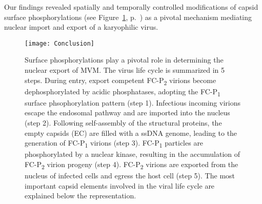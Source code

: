 \par
\medskip
Our findings revealed spatially and temporally controlled modifications of capsid surface phosphorylations (see Figure~\ref{Scheme}, p.~\pageref{Scheme}) as a pivotal mechanism mediating nuclear import and export of a karyophilic virus. 







\begin{figure}[H]
\centering
  \texttt{[image: Conclusion]}
  \caption[The pivotal role of capsid surface phosphorylations in the nuclear export of MVM.]
   {Surface phosphorylations play a pivotal role in determining the nuclear export of MVM. The virus life cycle is summarized in 5 steps. During entry, export competent FC-P\textsubscript{2} virions become dephosphorylated by acidic phosphatases, adopting the FC-P\textsubscript{1} surface phsophorylation pattern (step 1). Infectious incoming virions escape the endosomal pathway and are imported into the nucleus (step 2). Following self-assembly of the structural proteins, the empty capsids (EC) are filled with a ssDNA genome, leading to the generation of FC-P\textsubscript{1} virions (step 3). FC-P\textsubscript{1} particles are phosphorylated by a nuclear kinase, resulting in the accumulation of FC-P\textsubscript{2} virion progeny (step 4). FC-P\textsubscript{2} virions are exported from the nucleus of infected cells and egress the host cell (step 5). The most important capsid elements involved in the viral life cycle are explained below the representation.} 
\label{Scheme}
\end{figure}















